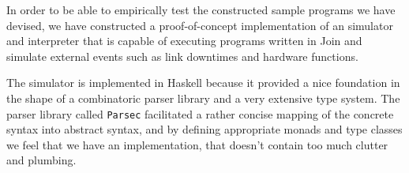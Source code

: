 

In order to be able to empirically test the constructed sample programs we have
devised, we have constructed a proof-of-concept implementation of an
simulator and interpreter that is capable of executing programs written in Join and
simulate external events such as link downtimes and hardware functions.

The simulator is implemented in Haskell because it provided a nice foundation in
the shape of a combinatoric parser library and a very extensive type system. The
parser library called \texttt{Parsec} \cite{parsec} facilitated a rather
concise mapping of the concrete syntax into abstract syntax, and by defining
appropriate monads and type classes we feel that we have an implementation,
that doesn't contain too much clutter and plumbing.

